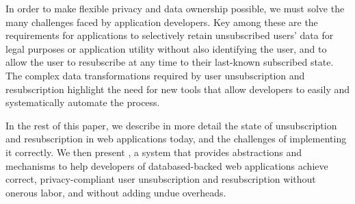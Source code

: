 In order to make flexible privacy and data ownership possible, we must solve the many
challenges faced by application developers. Key among these are the requirements for applications to
selectively retain unsubscribed users' data for legal purposes or application utility without also
identifying the user, and to allow the user to resubscribe at any time to their last-known
subscribed state. The complex data transformations required by user unsubscription and
resubscription highlight the need for new tools that allow developers to easily and systematically
automate the process.

In the rest of this paper, we describe in more detail the state of unsubscription and resubscription in
web applications today, and the challenges of implementing it correctly.  We then present \sys, a
system that provides abstractions and mechanisms to help developers of databased-backed web
applications achieve correct, privacy-compliant user unsubscription and resubscription without
onerous labor, and without adding undue overheads.
